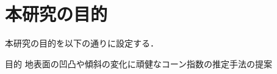 \documentclass[../main]{subfiles}
\begin{document}
\graphicspath{{../figures/chap1/}}

\section{本研究の目的}
\label{sec:intro_my_purpose}
本研究の目的を以下の通りに設定する．

\bigskip
\begin{itembox}[c]{目的}
    \centering
    地表面の凹凸や傾斜の変化に頑健なコーン指数の推定手法の提案
\end{itembox}
\end{document}
